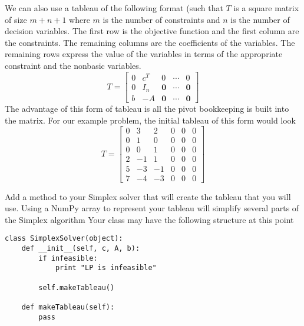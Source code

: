 We can also use a tableau of the following format (such that $T$ is a square matrix of size $m+n+1$ 
where $m$ is the number of constraints and $n$ is the number of decision variables.
The first row is the objective function and the first column are the constraints.
The remaining columns are the coefficients of the variables.
The remaining rows express the value of the variables in terms of the appropriate constraint and the nonbasic variables.
\begin{equation}
T = \begin{bmatrix}
    0 & c^T   & 0 & \cdots & 0 \\
    0 & I_n & \boldsymbol{0} & \cdots & \boldsymbol{0} \\
    b & -A  & \boldsymbol{0} & \cdots & \boldsymbol{0}
\end{bmatrix}
\label{eqn:matrix_tab}
\end{equation}
The advantage of this form of tableau is all the pivot bookkeeping is built into the matrix.
For our example problem, the initial tableau of this form would look
\begin{equation*}
T = \begin{bmatrix}
        0 & 3 & 2 & 0 & 0 & 0 \\
        0 & 1 & 0 & 0 & 0 & 0 \\
        0 & 0 & 1 & 0 & 0 & 0 \\
        2 &-1 & 1 & 0 & 0 & 0 \\
        5 &-3 &-1 & 0 & 0 & 0 \\
        7 &-4 &-3 & 0 & 0 & 0
\end{bmatrix}
\label{eqn:matrix_inittab}
\end{equation*}

\begin{problem}
Add a method to your Simplex solver that will create the tableau that you will use.
Using a NumPy array to represent your tableau will simplify several parts of the Simplex algorithm
Your class may have the following structure at this point
\begin{lstlisting}
class SimplexSolver(object):
    def __init__(self, c, A, b):
        if infeasible:
            print "LP is infeasible"
            
        self.makeTableau()
        
    def makeTableau(self):
        pass
\end{lstlisting}
\label{prob:maketableau}
\end{problem}

